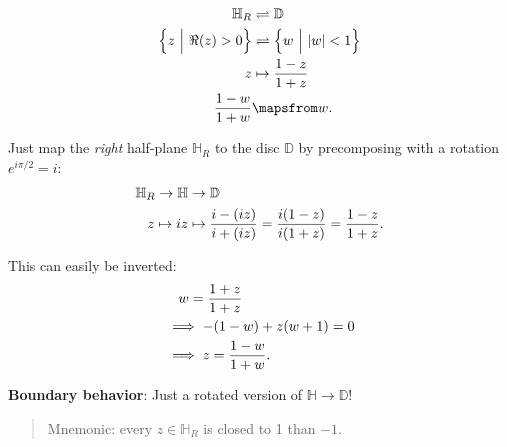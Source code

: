 \begin{proposition}

\begin{align*}
{\mathbb{H}}_{R} &\rightleftharpoons{\mathbb{D}}\\
\left\{{ z {~\mathrel{\Big|}~}\Re(z) > 0 }\right\} &\rightleftharpoons\left\{{ w {~\mathrel{\Big|}~}{\left\lvert {w} \right\rvert} < 1 }\right\} \\
z &\mapsto {1-z \over 1+z} \\
{1-w\over 1+w} &\mapsfrom w
.\end{align*}

Just map the \emph{right} half-plane \({\mathbb{H}}_R\) to the disc
\({\mathbb{D}}\) by precomposing with a rotation \(e^{i\pi/2} = i\):
\begin{align*}
{\mathbb{H}}_{R} \to {\mathbb{H}}&\to {\mathbb{D}}\\
z \mapsto iz &\mapsto {i- (iz) \over i + (iz)} = {i(1-z) \over i(1+z) } = {1-z \over 1+z}
.\end{align*}

This can easily be inverted:
\begin{align*}
&\quad w = {1+z \over 1+z} \\
&\implies -(1-w) + z(w+1) = 0 \\
&\implies z = {1-w \over 1+w}
.\end{align*}

\textbf{Boundary behavior}: Just a rotated version of
\({\mathbb{H}}\to {\mathbb{D}}\)!

\begin{quote}
Mnemonic: every \(z\in {\mathbb{H}}_R\) is closed to 1 than \(-1\).
\end{quote}

\end{proposition}

